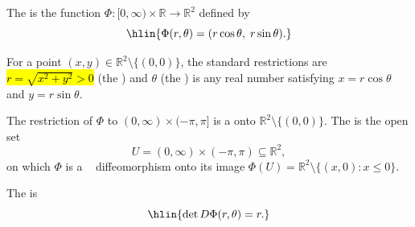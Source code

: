 \begin{definition} \label{definition:polar_coordinates_on_R2}
    The  is the function $\Phi : [0,\infty) \times \mathbb{R} \to \mathbb{R}^2$ defined by
    $$\hlin{\Phi(r,\theta) = (r\cos\theta,\; r\sin\theta).}$$

    For a point $(x,y) \in \mathbb{R}^2 \setminus \{(0,0)\}$, the standard restrictions are
    \hl{$r = \sqrt{x^2 + y^2} > 0$} (the ) and
    $\theta$ (the ) is any real number satisfying
    $x = r\cos\theta$ and $y = r\sin\theta$.

    The restriction of $\Phi$ to $(0,\infty) \times (-\pi,\pi]$ is a  onto $\mathbb{R}^2 \setminus \{(0,0)\}$.
    The  is the open set
    $$U = (0,\infty) \times (-\pi,\pi) \subseteq \mathbb{R}^2,$$
    on which $\Phi$ is a  \
    diffeomorphism onto its image $\Phi(U) = \mathbb{R}^2 \setminus \{(x,0) : x \leq 0\}$.

    The  is
    $$\hlin{\det D\Phi(r,\theta) = r.}$$
\end{definition}